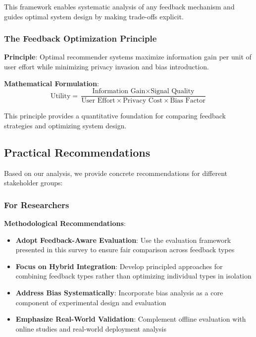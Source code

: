 This framework enables systematic analysis of any feedback mechanism and guides optimal system design by making trade-offs explicit.

\subsubsection{The Feedback Optimization Principle}
\textbf{Principle}: Optimal recommender systems maximize information gain per unit of user effort while minimizing privacy invasion and bias introduction.

\textbf{Mathematical Formulation}:
\begin{equation}
\text{Utility} = \frac{\text{Information Gain} \times \text{Signal Quality}}{\text{User Effort} \times \text{Privacy Cost} \times \text{Bias Factor}}
\end{equation}

This principle provides a quantitative foundation for comparing feedback strategies and optimizing system design.

\subsection{Practical Recommendations}

Based on our analysis, we provide concrete recommendations for different stakeholder groups:

\subsubsection{For Researchers}

\textbf{Methodological Recommendations}:
\begin{itemize}
    \item \textbf{Adopt Feedback-Aware Evaluation}: Use the evaluation framework presented in this survey to ensure fair comparison across feedback types
    \item \textbf{Focus on Hybrid Integration}: Develop principled approaches for combining feedback types rather than optimizing individual types in isolation
    \item \textbf{Address Bias Systematically}: Incorporate bias analysis as a core component of experimental design and evaluation
    \item \textbf{Emphasize Real-World Validation}: Complement offline evaluation with online studies and real-world deployment analysis
\end{itemize}


